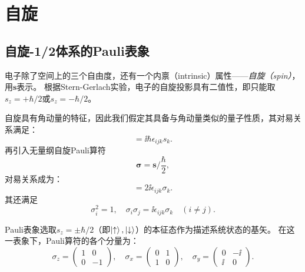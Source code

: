 \section{自旋}
\label{sec:spin}

\subsection{自旋-1/2体系的Pauli表象}
\label{subsec:spin_single_particle}

电子除了空间上的三个自由度，还有一个内禀（intrinsic）属性——\emph{自旋（spin）}，用$\bm{s}$表示。
根据Stern-Gerlach实验，电子的自旋投影具有二值性，即只能取$s_z=+\hbar/2$或$s_z=-\hbar/2$。

自旋具有角动量的特征，因此我们假定其具备与角动量类似的量子性质，其对易关系满足：
\begin{equation}
    [s_i,s_j]=\ii\hbar\epsilon_{ijk}s_k.
\end{equation}
再引入无量纲自旋Pauli算符
\begin{equation}
    \bm{\sigma}=\bm{s}/\frac{\hbar}{2},
\end{equation}
对易关系成为：
\begin{equation}
    [\sigma_i,\sigma_j]=2\ii\epsilon_{ijk}\sigma_k.
\end{equation}
其还满足
\begin{equation}
    \sigma_i^2 = 1, \quad
    \sigma_i\sigma_j = \ii \epsilon_{ijk}\sigma_k \quad (i\ne j).
\end{equation}

Pauli表象选取$s_z=\pm\hbar/2$（即$\ket{\uparrow},\ket{\downarrow}$）的本征态作为描述系统状态的基矢。
在这一表象下，Pauli算符的各个分量为：
\begin{equation}
    \sigma_z = \begin{pmatrix}1& 0\\0&-1\end{pmatrix}, \quad
    \sigma_x = \begin{pmatrix}0& 1\\1& 0\end{pmatrix}, \quad
    \sigma_y = \begin{pmatrix}0&-\ii\\ \ii& 0\end{pmatrix}.
\end{equation}

